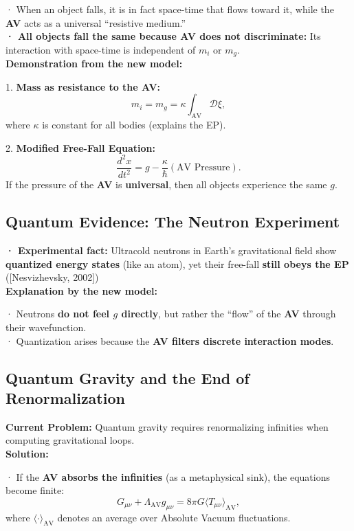 \documentclass[a4paper]{article}
\theoremstyle{definition}
\theoremstyle{remark}
\numberwithin{equation}{section}
\begin{document}
	· When an object falls, it is in fact space-time that flows toward it, while the \textbf{AV} acts as a universal ``resistive medium.''\\
	
	\textbf{· All objects fall the same because AV does not discriminate:} Its interaction with space-time is independent of \(m_i\) or \(m_g\).\\
	
	\textbf{Demonstration from the new model:}
	
	1. \textbf{Mass as resistance to the AV:}
	\[
	m_i = m_g = \kappa \int_{\text{AV}} \mathcal{D}\xi,
	\]
	where \(\kappa\) is constant for all bodies (explains the EP).
	
	2. \textbf{Modified Free-Fall Equation:}
	\[
	\frac{d^2 x}{dt^2} = g - \frac{\kappa}{\hbar} \left( \text{AV Pressure} \right).
	\]
	If the pressure of the \textbf{AV} is \textbf{universal}, then all objects experience the same \(g\).
	
	\subsection{Quantum Evidence: The Neutron Experiment}
	
	\textbf{· Experimental fact:} Ultracold neutrons in Earth's gravitational field show \textbf{quantized energy states} (like an atom), yet their free-fall \textbf{still obeys the EP} ([Nesvizhevsky, 2002])\\
	
	\textbf{Explanation by the new model:}
	
	· Neutrons \textbf{do not feel \(g\) directly}, but rather the ``flow'' of the \textbf{AV} through their wavefunction.\\
	
	· Quantization arises because the \textbf{AV filters discrete interaction modes}.
	
	\subsection{Quantum Gravity and the End of Renormalization}
	
	\textbf{Current Problem:} Quantum gravity requires renormalizing infinities when computing gravitational loops.\\
	
	\textbf{Solution:}
	
	· If the \textbf{AV absorbs the infinities} (as a metaphysical sink), the equations become finite:
	\[
	G_{\mu\nu} + \Lambda_{\text{AV}} g_{\mu\nu} = 8\pi G \langle T_{\mu\nu} \rangle_{\text{AV}},
	\]
	where \(\langle \cdot \rangle_{\text{AV}}\) denotes an average over Absolute Vacuum fluctuations.
	
\end{document}
